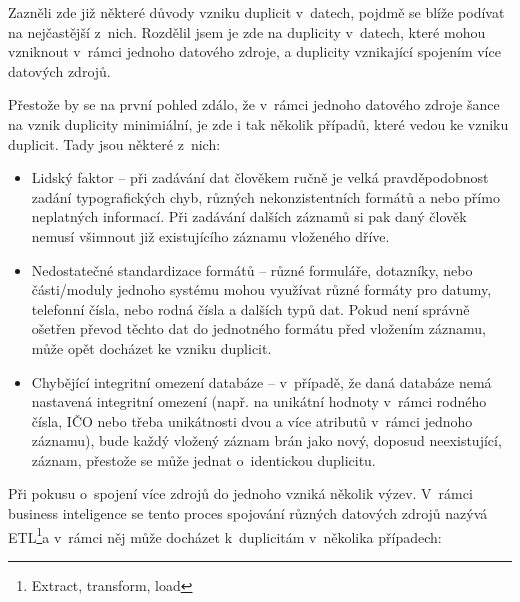 Zazněli zde již některé důvody vzniku duplicit v~datech, pojdmě se blíže podívat na nejčastější z~nich. Rozdělil jsem je zde na duplicity v~datech, které mohou vzniknout v~rámci jednoho datového zdroje, a duplicity vznikající spojením více datových zdrojů.

Přestože by se na první pohled zdálo, že v~rámci jednoho datového zdroje šance na vznik duplicity minimiální, je zde i tak několik případů, které vedou ke vzniku duplicit. Tady jsou některé z~nich:

\begin{itemize}
	\item Lidský faktor – při zadávání dat člověkem ručně je velká pravděpodobnost zadání typografických chyb, různých nekonzistentních formátů a nebo přímo neplatných informací. Při zadávání dalších záznamů si pak daný člověk nemusí všimnout již existujícího záznamu vloženého dříve.
	\item Nedostatečné standardizace formátů – různé formuláře, dotazníky, nebo části/moduly jednoho systému mohou využívat různé formáty pro datumy, telefonní čísla, nebo rodná čísla a dalších typů dat. Pokud není správně ošetřen převod těchto dat do jednotného formátu před vložením záznamu, může opět docházet ke vzniku duplicit.
	\item Chybějící integritní omezení databáze – v~případě, že daná databáze nemá nastavená integritní omezení (např. na unikátní hodnoty v~rámci rodného čísla, IČO nebo třeba unikátnosti dvou a více atributů v~rámci jednoho záznamu), bude každý vložený záznam brán jako nový, doposud neexistující, záznam, přestože se může jednat o~identickou duplicitu.
\end{itemize}

Při pokusu o~spojení více zdrojů do jednoho vzniká několik výzev. V~rámci business inteligence se tento proces spojování různých datových zdrojů nazývá ETL\footnote{Extract, transform, load
}a v~rámci něj může docházet k~duplicitám v~několika případech:

